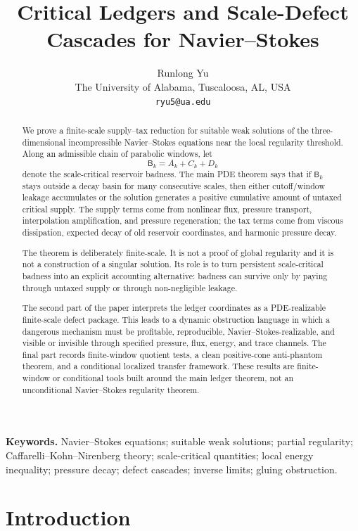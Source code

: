 \documentclass[11pt]{article}
\title{Critical Ledgers and Scale-Defect Cascades for Navier--Stokes}
\author{Runlong Yu\\
	The University of Alabama, Tuscaloosa, AL, USA\\
	\texttt{ryu5@ua.edu}}
\date{}
\numberwithin{equation}{section}
\newcommand{\Bbad}{\mathsf B}
\begin{document}
\maketitle


\begin{abstract}
We prove a finite-scale supply--tax reduction for suitable weak solutions of
the three-dimensional incompressible Navier--Stokes equations near the local
regularity threshold.  Along an admissible chain of parabolic windows, let
\[
    \Bbad_k=A_k+C_k+D_k
\]
denote the scale-critical reservoir badness.  The main PDE theorem says that
if \(\Bbad_k\) stays outside a decay basin for many consecutive scales, then
either cutoff/window leakage accumulates or the solution generates a positive
cumulative amount of untaxed critical supply.  The supply terms come from
nonlinear flux, pressure transport, interpolation amplification, and pressure
regeneration; the tax terms come from viscous dissipation, expected decay of
old reservoir coordinates, and harmonic pressure decay.

The theorem is deliberately finite-scale.  It is not a proof of global
regularity and it is not a construction of a singular solution.  Its role is
to turn persistent scale-critical badness into an explicit accounting
alternative: badness can survive only by paying through untaxed supply or
through non-negligible leakage.

The second part of the paper interprets the ledger coordinates as a
PDE-realizable finite-scale defect package.  This leads to a dynamic
obstruction language in which a dangerous mechanism must be profitable,
reproducible, Navier--Stokes-realizable, and visible or invisible through
specified pressure, flux, energy, and trace channels.  The final part records
finite-window quotient tests, a clean positive-cone anti-phantom theorem, and
a conditional localized transfer framework.  These results are finite-window
or conditional tools built around the main ledger theorem, not an
unconditional Navier--Stokes regularity theorem.
\end{abstract}


\noindent\textbf{Keywords.} Navier--Stokes equations; suitable weak solutions; partial regularity; Caffarelli--Kohn--Nirenberg theory; scale-critical quantities; local energy inequality; pressure decay; defect cascades; inverse limits; gluing obstruction.

\tableofcontents


\section{Introduction}\label{sec:introduction}
\end{document}
